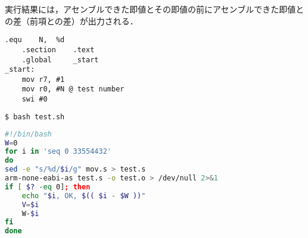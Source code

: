 実行結果には，アセンブルできた即値とその即値の前にアセンブルできた即値との差（前項との差）が出力される．
\begin{center}
    \begin{minipage}[t]{0.34\textwidth}
        \centering
        \begin{lstlisting}[caption={{\ttfamily mov.s}変更後},label={src:mov2},frame={left}]
    .equ    N,  %d
    .section    .text
    .global     _start
_start:
    mov r7, #1
    mov r0, #N @ test number
    swi #0
    \end{lstlisting}
        \begin{lstlisting}[language={Bash},numbers={none},caption={実行},label={src:testexec},frame={leftline}]
$ bash test.sh          
    \end{lstlisting}
    \end{minipage}
    \hspace{2em}
    \begin{minipage}[t]{0.58\textwidth}
        \centering
        \begin{lstlisting}[language={Bash},caption={{\ttfamily test.sh}},label={src:test},frame={left}]
#!/bin/bash
W=0
for i in 'seq 0 33554432'
do
sed -e "s/%d/$i/g" mov.s > test.s
arm-none-eabi-as test.s -o test.o > /dev/null 2>&1
if [ $? -eq 0]; then
    echo "$i, OK, $(( $i - $W ))"
    V=$i
    W-$i
fi
done
    \end{lstlisting}
    \end{minipage}
\end{center}
